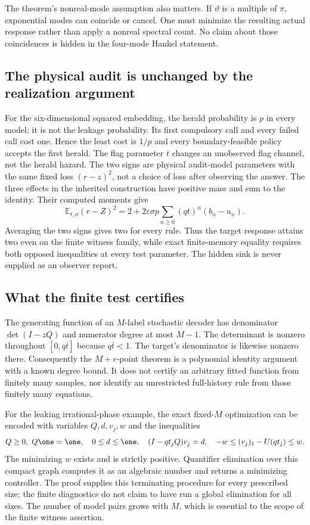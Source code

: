 The theorem's nonreal-mode assumption also matters. If $\vartheta$ is a multiple of $\pi$, exponential modes can coincide or cancel. One must minimize the resulting actual response rather than apply a nonreal spectral count. No claim about those coincidences is hidden in the four-mode Hankel statement.

\subsection{The physical audit is unchanged by the realization argument}
For the six-dimensional squared embedding, the herald probability is $p$ in every model; it is not the leakage probability. Its first compulsory call and every failed call cost one. Hence the least cost is $1/p$ and every boundary-feasible policy accepts the first herald. The flag parameter $t$ changes an unobserved flag channel, not the herald hazard. The two signs are physical audit-model parameters with the same fixed loss $(r-z)^2$, not a choice of loss after observing the answer. The three effects in the inherited construction have positive mass and sum to the identity. Their computed moments give
\[
 \mathbb E_{t,\sigma}(r-Z)^2
 =2+2\varepsilon\sigma p\sum_{n\ge0}(qt)^n(b_n-u_n).
\]
Averaging the two signs gives two for every rule. Thus the target response attains two even on the finite witness family, while exact finite-memory equality requires both opposed inequalities at every test parameter. The hidden sink is never supplied as an observer report.

\subsection{What the finite test certifies}
The generating function of an $M$-label stochastic decoder has denominator $\det(I-zQ)$ and numerator degree at most $M-1$. The determinant is nonzero throughout $[0,q\bar t]$ because $q\bar t<1$. The target's denominator is likewise nonzero there. Consequently the $M+r$-point theorem is a polynomial identity argument with a known degree bound. It does not certify an arbitrary fitted function from finitely many samples, nor identify an unrestricted full-history rule from those finitely many equations.

For the leaking irrational-phase example, the exact fixed-$M$ optimization can be encoded with variables $Q,d,v_j,w$ and the inequalities
\[
 Q\ge0,\ Q\one=\one,\quad 0\le d\le\one,\quad
 (I-qt_jQ)v_j=d,\quad
 -w\le(v_j)_1-U(qt_j)\le w.
\]
The minimizing $w$ exists and is strictly positive. Quantifier elimination over this compact graph computes it as an algebraic number and returns a minimizing controller. The proof supplies this terminating procedure for every prescribed size; the finite diagnostics do not claim to have run a global elimination for all sizes. The number of model pairs grows with $M$, which is essential to the scope of the finite witness assertion.

